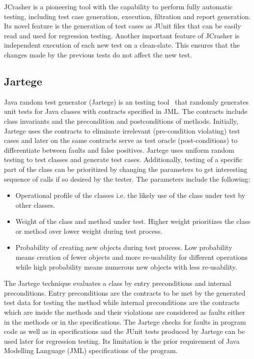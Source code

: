 JCrasher is a pioneering tool with the capability to perform fully automatic testing, including test case generation, execution, filtration and report generation. Its novel feature is the generation of test cases as JUnit files that can be easily read and used for regression testing. Another important feature of JCrasher is independent execution of each new test on a clean-slate. This ensures that the changes made by the previous tests do not affect the new test.  



\subsection{Jartege} \label{jartege_2}
Java random test generator (Jartege) is an testing tool~\cite{oriat2005jartege} that randomly generates unit tests for Java classes with contracts specified in JML. The contracts include class invariants and the precondition and postconditions of methods. Initially, Jartege uses the contracts to eliminate irrelevant (pre-condition violating) test cases and later on the same contracts serve as test oracle (post-conditions) to differentiate between faults and false positives. Jartege uses uniform random testing to test classes and generate test cases. Additionally, testing of a specific part of the class can be prioritized by changing the parameters to get interesting sequence of calls if so desired by the tester. The parameters include the following: 

\begin{itemize}
\item Operational profile of the classes i.e. the likely use of the class under test by other classes.  
\item Weight of the class and method under test. Higher weight prioritizes the class or method over lower weight during test process. 
\item Probability of creating new objects during test process. Low probability means creation of fewer objects and more re-usability for different operations while high probability means numerous new objects with less re-usability.
\end{itemize}

The Jartege technique evaluates a class by entry preconditions and internal preconditions. Entry preconditions are the contracts to be met by the generated test data for testing the method while internal preconditions are the contracts which are inside the methods and their violations are considered as faults either in the methods or in the specifications. The Jartege checks for faults in program code as well as in specifications and the JUnit tests produced by Jartege can be used later for regression testing. Its limitation is the prior requirement of Java Modelling Language (JML) specifications of the program.

